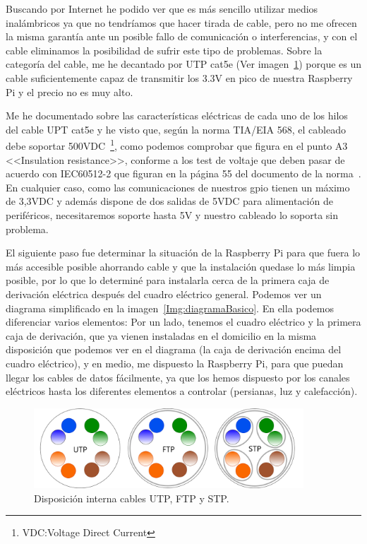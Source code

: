 Buscando por Internet he podido ver que es más sencillo utilizar medios inalámbricos ya que no tendríamos que hacer tirada de cable, pero no me ofrecen la misma garantía ante un posible fallo de comunicación o interferencias, y con el cable eliminamos la posibilidad de sufrir este tipo de problemas. Sobre la categoría del cable, me he decantado por UTP cat5e (Ver imagen~\ref{Img:CablesDatos}) porque es un cable suficientemente capaz de transmitir los 3.3V en pico de nuestra Raspberry Pi y el precio no es muy alto.

Me he documentado sobre las características eléctricas de cada uno de los hilos del cable UPT cat5e y he visto que, según la norma TIA/EIA 568, el cableado debe soportar 500VDC~\footnote{VDC:Voltage Direct Current}, como podemos comprobar que figura en el punto A3 <<Insulation resistance>>, conforme a los test de voltaje que deben pasar de acuerdo con IEC60512-2 que figuran en la página 55 del documento de la norma~\cite{manual:568.2}. En cualquier caso, como las comunicaciones de nuestros gpio tienen un máximo de 3,3VDC y además dispone de dos salidas de 5VDC para alimentación de periféricos, necesitaremos soporte hasta 5V y nuestro cableado lo soporta sin problema.


El siguiente paso fue determinar la situación de la Raspberry Pi para que fuera lo más accesible posible ahorrando cable y que la instalación quedase lo más limpia posible, por lo que lo determiné para instalarla cerca de la primera caja de derivación eléctrica después del cuadro eléctrico general. Podemos ver un diagrama simplificado en la imagen~\ref{Img:diagramaBasico}. En ella podemos diferenciar varios elementos: Por un lado, tenemos el cuadro eléctrico y la primera caja de derivación, que ya vienen instaladas en el domicilio en la misma disposición que podemos ver en el diagrama (la caja de derivación encima del cuadro eléctrico), y en medio, me dispuesto la Raspberry Pi, para que puedan llegar los cables de datos fácilmente, ya que los hemos dispuesto por los canales eléctricos hasta los diferentes elementos a controlar (persianas, luz y calefacción).

\begin{figure}[h]
    \centering
    \includegraphics[width=0.9\textwidth]{img/CABLES.png}
    \caption{Disposición interna cables UTP, FTP y STP.} \label{Img:CablesDatos}
\end{figure}

